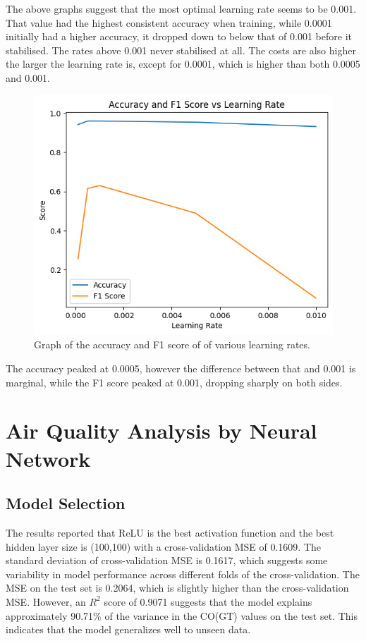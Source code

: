 \documentclass[a4paper]{article}
\begin{document}
The above graphs suggest that the most optimal learning rate seems to be 0.001. That value had the highest consistent accuracy when training, while 0.0001 initially had a higher accuracy, it dropped down to below that of 0.001 before it stabilised. The rates above 0.001 never stabilised at all. The costs are also higher the larger the learning rate is, except for 0.0001, which is higher than both 0.0005 and 0.001.

\newpage
\begin{figure}[htbp]
    \centering
    \includegraphics[width=0.5\linewidth]{1.23.png}
    \caption{\centering Graph of the accuracy and F1 score of of various learning rates.}
\end{figure}

The accuracy peaked at 0.0005, however the difference between that and 0.001 is marginal, while the F1 score peaked at 0.001, dropping sharply on both sides.

\newpage
\section{Air Quality Analysis by Neural Network}
\subsection{Model Selection}

The results reported that ReLU is the best activation function and the best hidden layer size is (100,100) with a cross-validation MSE of 0.1609.
The standard deviation of cross-validation MSE is 0.1617, which suggests some variability in model performance across different folds of the cross-validation.
The MSE on the test set is 0.2064, which is slightly higher than the cross-validation MSE. However, an \( R^2 \) score of 0.9071 suggests that the model explains approximately 90.71\% of the variance in the CO(GT) values on the test set. This indicates that the model generalizes well to unseen data.
\end{document}
